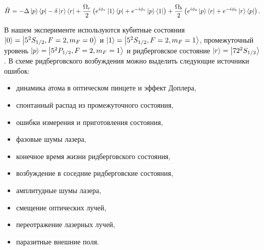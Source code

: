\begin{equation}
	\hat{H}=-\Delta\left| p \right\rangle\left\langle p \right|-\delta\left| r \right\rangle\left\langle r \right|+\frac{\Omega_r}{2}\left(e^{i\phi_r}\left| 1 \right\rangle\left\langle p \right|+e^{-i\phi_r}\left| p \right\rangle\left\langle 1 \right|\right)+\frac{\Omega_b}{2}\left(e^{i\phi_b}\left| p \right\rangle\left\langle r \right|+e^{-i\phi_b}\left| r \right\rangle\left\langle p \right|\right).
\end{equation}

В нашем эксперименте используются кубитные состояния $\left| 0 \right\rangle = \left| 5^2S_{1/2},F=2,m_F=0 \right\rangle$ и $\left| 1 \right\rangle = \left| 5^2S_{1/2},F=2,m_F=1 \right\rangle$, промежуточный уровень $\left| p \right\rangle = \left| 5^2P_{1/2},F=2,m_F=1 \right\rangle$ и ридберговское состояние $\left| r \right\rangle=\left| {72}^2S_{1/2} \right\rangle$. В схеме ридберговского возбуждения можно выделить следующие источники ошибок:  


\begin{itemize}
	\item динамика атома в оптическом пинцете и эффект Доплера,
	\item спонтанный распад из промежуточного состояния, 
	\item ошибки измерения и приготовления состояния,
	\item фазовые шумы лазера, 
	\item конечное время жизни ридберговского состояния,
	\item возбуждение в соседние ридберговские состояния,
	\item амплитудные шумы лазера,
	\item смещение оптических лучей, 
	\item переотражение лазерных лучей, 
	\item паразитные внешние поля.
\end{itemize}

